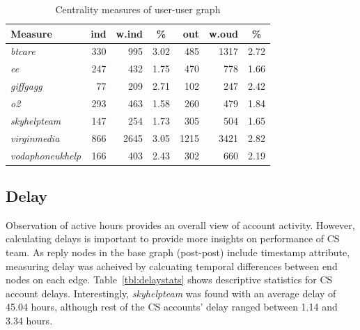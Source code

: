 \documentclass[sigconf]{acmart}
\begin{document}
\begin{table}[!h]
\centering
\begin{tabularx}{\columnwidth}{l|rrc|rrc}
\toprule
\textbf{Measure} & \textbf{ind} & \textbf{w.ind} & \textbf{\%} & \textbf{out} & \textbf{w.oud} & \textbf{\%}\\ 
\midrule
{\emph{btcare}} & 330 & 995 & 3.02 & 485 & 1317 & 2.72\\
{\emph{ee}} & 247 & 432 & 1.75 & 470 & 778 & 1.66 \\
{\emph{giffgagg}} & 77 & 209 & 2.71 & 102 & 247 & 2.42 \\ 
{\emph{o2}} & 293 & 463 & 1.58 & 260 & 479 & 1.84 \\
{\emph{skyhelpteam}} & 147 & 254 & 1.73 & 305 & 504 & 1.65\\
{\emph{virginmedia}} & 866 & 2645 & 3.05 & 1215 & 3421 & 2.82\\
{\emph{vodaphoneukhelp}} & 166 & 403 & 2.43 & 302 & 660 & 2.19\\
\bottomrule
\end{tabularx}
\caption{Centrality measures of user-user graph}
\label{tbl:uucentralitymeasures}
\end{table}

\subsection{Delay}\label{results_delay}

Observation of active hours provides an overall view of
account activity. However, calculating delays is important to provide
more insights on performance of CS team. As reply nodes in the base graph (post-post)
include timestamp attribute, measuring delay was acheived by calcuating temporal
differences between end nodes on each edge. Table~\ref{tbl:delaystats} 
shows descriptive statistics for CS account delays. Interestingly, 
{\emph{skyhelpteam}} was found with an average delay of 45.04 hours,
although rest of the CS accounts' delay ranged between 1.14 and 3.34 hours. 

\end{document}
